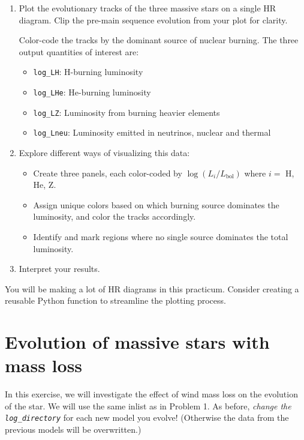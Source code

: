 \documentclass[11pt,a4paper]{article}
\begin{document}
\begin{enumerate}[label=(\alph*)]
    \item Plot the evolutionary tracks of the three massive stars on a single HR diagram. 
    Clip the pre-main sequence evolution from your plot for clarity.

    Color-code the tracks by the dominant source of nuclear burning. The three output quantities of interest are:
    \begin{itemize}
        \item \texttt{log\_LH}: H-burning luminosity
        \item \texttt{log\_LHe}: He-burning luminosity
        \item \texttt{log\_LZ}: Luminosity from burning heavier elements
        \item \texttt{log\_Lneu}: Luminosity emitted in neutrinos, nuclear and thermal 
    \end{itemize}
    \item Explore different ways of visualizing this data:
    \begin{itemize}[label=--]
        \item Create three panels, each color-coded by $\log (L_i/L_{\text{bol}})$ where $i = $ H, He, Z.
        \item Assign unique colors based on which burning source dominates the luminosity, and color the tracks accordingly.
        \item Identify and mark regions where no single source dominates the total luminosity.
    \end{itemize}

    \item Interpret your results. 

\end{enumerate}



\begin{tcolorbox}[protipbox]
You will be making a lot of HR diagrams in this practicum. Consider creating a reusable Python function to streamline the plotting process.
\end{tcolorbox}


\section{Evolution of massive stars with mass loss}

In this exercise, we will investigate the effect of wind mass loss on the evolution of the star. 
We will use the same inlist as in Problem 1. As before, \emph{change the \texttt{log\_directory}} for each new model you evolve! (Otherwise the data from the previous models will be overwritten.)
\end{document}

